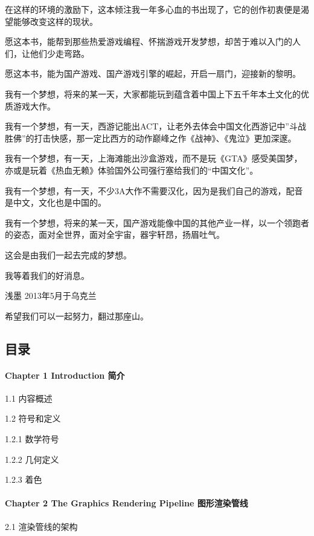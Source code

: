 \documentclass[
  paper=a4,
  ,captions=tableheading
]{scrartcl}
\begin{document}
在这样的环境的激励下，这本倾注我一年多心血的书出现了，它的创作初衷便是渴望能够改变这样的现状。

愿这本书，能帮到那些热爱游戏编程、怀揣游戏开发梦想，却苦于难以入门的人们，让他们少走弯路。

愿这本书，能为国产游戏、国产游戏引擎的崛起，开启一扇门，迎接新的黎明。

我有一个梦想，将来的某一天，大家都能玩到蕴含着中国上下五千年本土文化的优质游戏大作。

我有一个梦想，有一天，西游记能出ACT，让老外去体会中国文化西游记中''斗战胜佛''的打击快感，那一定比西方的动作巅峰之作《战神》、《鬼泣》更加深邃。

我有一个梦想，有一天，上海滩能出沙盒游戏，而不是玩《GTA》感受美国梦，亦或是玩着《热血无赖》体验国外公司强行塞给我们的``中国文化''。

我有一个梦想，有一天，不少3A大作不需要汉化，因为是我们自己的游戏，配音是中文，文化也是中国的。

我有一个梦想，将来的某一天，国产游戏能像中国的其他产业一样，以一个领跑者的姿态，面对全世界，面对全宇宙，器宇轩昂，扬眉吐气。

这会是由我们一起去完成的梦想。

我等着我们的好消息。

浅墨 2013年5月于乌克兰

希望我们可以一起努力，翻过那座山。

\subsection{目录}\label{ux76eeux5f55-1}

\paragraph{Chapter 1 Introduction
简介}\label{chapter-1-introduction-ux7b80ux4ecb}

1.1 内容概述

1.2 符号和定义

1.2.1 数学符号

1.2.2 几何定义

1.2.3 着色

\paragraph{Chapter 2 The Graphics Rendering Pipeline
图形渲染管线}\label{chapter-2-the-graphics-rendering-pipeline-ux56feux5f62ux6e32ux67d3ux7ba1ux7ebf}

2.1 渲染管线的架构
\end{document}
